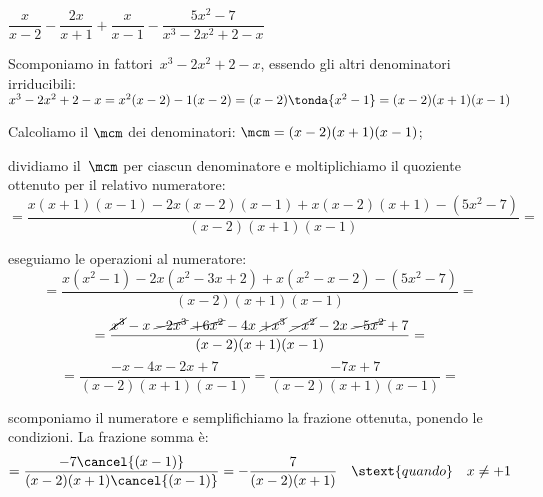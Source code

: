 \newpage %

 \begin{esempio}
\(\dfrac{x}{x-2}-\dfrac{2x}{x+1}+
  \dfrac{x}{x-1}-\dfrac{5x^{2}-7}{x^{3}-2x^{2}+2-x}\)
\begin{enumeratea}
 \item Scomponiamo in fattori~\(x^{3}-2x^{2}+2-x\), 
  essendo gli altri denominatori irriducibili: 
  \(x^{3}-2x^{2}+2-x=x^2(x-2)-1(x-2)=(x-2) \tonda{x^2-1} =
   (x-2)(x+1)(x-1)\)%

 \item Calcoliamo il \(\mcm\) dei denominatori: 
  \(\mcm=(x-2)(x+1)(x-1)\);
  
 \item dividiamo il~\(\mcm\) per ciascun denominatore e moltiplichiamo il 
  quoziente ottenuto per il relativo numeratore:
 \[=\dfrac{x(x+1)(x-1)-2x(x-2)(x-1)+x(x-2)(x+1)-(5x^{2}-7)}
         {(x-2)(x+1)(x-1)}=\]
 \item eseguiamo le operazioni al numeratore:
\[=\dfrac{x(x^2-1)-2x(x^2-3x+2)+x(x^2-x-2)-(5x^{2}-7)}{(x-2)(x+1)(x-1)} = \]
\[=\dfrac{\cancel{x^3}-x~\cancel{-2x^3}~\cancel{+6x^2}-4x~\cancel{+x^3}
          ~\cancel{-x^2}-2x~\cancel{-5x^2}+7}
         {(x-2)(x+1)(x-1)}=\]
\[=\dfrac{-x-4x-2x+7}{(x-2)(x+1)(x-1)}=\dfrac{-7x+7}{(x-2)(x+1)(x-1)}=\]
 \item scomponiamo il numeratore e semplifichiamo la frazione ottenuta, 
  ponendo le condizioni. La frazione somma è:
\[=\dfrac{-7\cancel{(x-1)}}{(x-2)(x+1)\cancel{(x-1)}}=
   -{\dfrac{7}{(x-2)(x+1)}} \quad  \stext{quando} \quad x \neq +1\]
 \end{enumeratea}
 \end{esempio}

